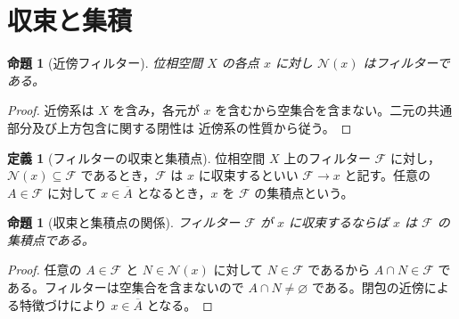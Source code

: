 \documentclass[a5paper,10pt,dvipdfmx]{jsarticle}
\theoremstyle{definition}
\newtheorem{defn}[ruledef]{定義}
\theoremstyle{plain}
\newtheorem{prop}[ruledef]{命題}
\newcommand{\GenronRefText}[2]{#2}
\begin{document}
\section{収束と集積}
\begin{prop}[近傍フィルター]\label{k237}
位相空間 $X$ の各点 $x$ に対し $\mathcal N(x)$ はフィルターである。
\end{prop}
\begin{proof}
近傍系は $X$ を含み，各元が $x$ を含むから空集合を含まない。二元の共通部分及び上方包含に関する閉性は \GenronRefText{K-000195}{近傍系の性質}から従う。
\end{proof}
\begin{defn}[フィルターの収束と集積点]\label{k238}
位相空間 $X$ 上のフィルター $\mathcal F$ に対し，$\mathcal N(x)\subseteq\mathcal F$ であるとき，$\mathcal F$ は $x$ に収束するといい $\mathcal F\to x$ と記す。任意の $A\in\mathcal F$ に対して $x\in\overline A$ となるとき，$x$ を $\mathcal F$ の集積点という。
\end{defn}
\begin{prop}[収束と集積点の関係]\label{k239}
フィルター $\mathcal F$ が $x$ に収束するならば $x$ は $\mathcal F$ の集積点である。
\end{prop}
\begin{proof}
任意の $A\in\mathcal F$ と $N\in\mathcal N(x)$ に対して $N\in\mathcal F$ であるから $A\cap N\in\mathcal F$ である。フィルターは空集合を含まないので $A\cap N\ne\varnothing$ である。\GenronRefText{K-000201}{閉包の近傍による特徴づけ}により $x\in\overline A$ となる。
\end{proof}
\end{document}
